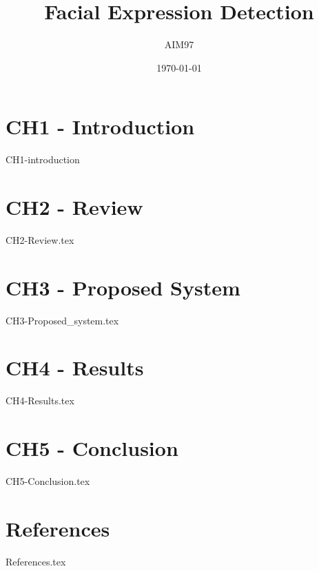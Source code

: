 \documentclass[a4paper]{book}
\title{Facial Expression Detection}
\author{AIM97}
\date{\today}
\begin{document}
	\maketitle
	\tableofcontents
	
	
	\chapter{CH1 - Introduction}
	{CH1-introduction}
	
	\chapter{CH2 - Review}
	{CH2-Review.tex}
	
	\chapter{CH3 - Proposed System}
	{CH3-Proposed_system.tex}
	
	\chapter{CH4 - Results}
	{CH4-Results.tex}
	
	\chapter{CH5 - Conclusion}
	{CH5-Conclusion.tex}
	
	\chapter{References}
	{References.tex}
	
\end{document}

